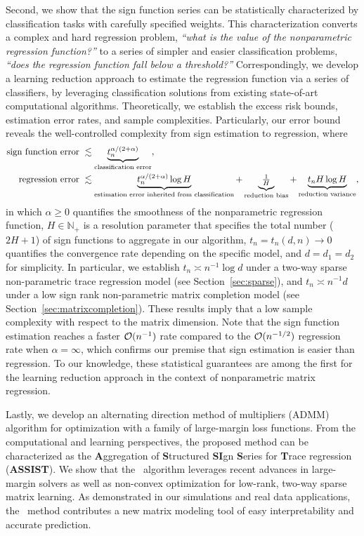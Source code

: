 \documentclass[aos]{imsart}
\theoremstyle{definition}
\newcommand*{\KeepStyleUnderBrace}[1]{%
\mathop{%
\mathchoice
{\underbrace{\displaystyle#1}}%
{\underbrace{\textstyle#1}}%
{\underbrace{\scriptstyle#1}}%
{\underbrace{\scriptscriptstyle#1}}%
}\limits
}
\def\NonparaM{\text{\bf \footnotesize ASSIST}}
\begin{document}
Second, we show that the sign function series can be statistically characterized by classification tasks with carefully specified weights. This characterization converts a complex and hard regression problem, \emph{``what is the value of the nonparametric regression function?''} to a series of simpler and easier classification problems, \emph{``does the regression function fall below a threshold?''} Correspondingly, we develop a learning reduction approach to estimate the regression function via a series of classifiers, by leveraging classification solutions from existing state-of-art computational algorithms. Theoretically, we establish the excess risk bounds, estimation error rates, and sample complexities. Particularly, our error bound reveals the well-controlled complexity from sign estimation to regression, where 
\vspace{-0.01in}
\begin{align*}
\text{sign function error }& \lesssim \KeepStyleUnderBrace{t_n^{\alpha/( 2+\alpha)}}_{\text{classification error}},\\
\text{regression error } & \lesssim  \KeepStyleUnderBrace{t_n^{\alpha/(2+\alpha)}\log H}_{\text{estimation error inherited from classification}}+\KeepStyleUnderBrace{\textstyle{1\over H}}_{\text{reduction bias}}+\KeepStyleUnderBrace{t_nH\log H}_{\text{reduction variance}},
\end{align*}
in which $\alpha\geq 0$ quantifies the smoothness of the nonparametric regression function, $H\in\mathbb{N}_{+}$ is a resolution parameter that specifies the total number ($2H+1$) of sign functions to aggregate in our algorithm, $t_n=t_n(d,n)\to 0$ quantifies the convergence rate depending on the specific model, and $d=d_1=d_2$ for simplicity. In particular, we establish $t_n\asymp n^{-1}\log d$ under a two-way sparse non-parametric trace regression model (see Section~\ref{sec:sparse}), and $t_n \asymp n^{-1}d$ under a low sign rank non-parametric matrix completion model (see Section~\ref{sec:matrixcompletion}). These results imply that a low sample complexity with respect to the matrix dimension. Note that the sign function estimation reaches a faster $\mathcal{O}(n^{-1})$ rate compared to the $\mathcal{O}(n^{-1/2})$ regression rate when $\alpha= \infty$, which confirms our premise that sign estimation is easier than regression. To our knowledge, these statistical guarantees are among the first for the learning reduction approach in the context of nonparametric matrix regression. 

Lastly, we develop an alternating direction method of multipliers (ADMM) algorithm for optimization with a family of large-margin loss functions. From the computational and learning perspectives, the proposed method can be characterized as the {\bf \small  A}ggregation of {\bf \small  S}tructured {\bf \small  SI}gn {\bf \small  S}eries for {\bf \small T}race regression ({\bf \footnotesize ASSIST}). We show that the \NonparaM\ algorithm leverages recent advances in large-margin solvers as well as non-convex optimization for low-rank, two-way sparse matrix learning. As demonstrated in our simulations and real data applications, the \NonparaM\ method contributes a new matrix modeling tool of easy interpretability and accurate prediction. 
\end{document}
